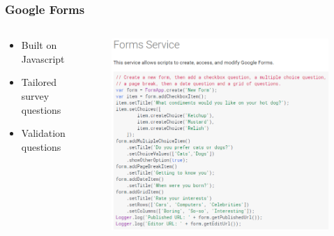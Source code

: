 \begin{frame}
	\frametitle{Google Forms}
	\begin{columns}
		\begin{column}{0.4\textwidth}
			\begin{itemize}
				\item Built on Javascript
				\item Tailored survey questions
				\item Validation questions
			\end{itemize}
		\end{column}
		\begin{column}{0.6\textwidth}
			\begin{figure}
				\centering
				\includegraphics[scale=0.35]{figures/GoogleScript.png}
			\end{figure}
		\end{column}
	\end{columns}
\end{frame}

